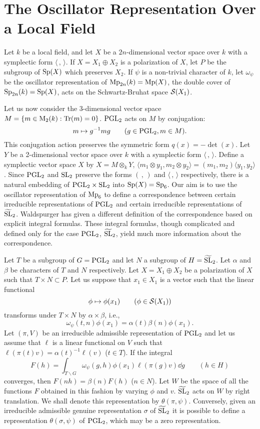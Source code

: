 \section{The Oscillator Representation Over a Local Field}
\label{sec:2}

Let $k$ be a local field, and let $X$ be a $2n$-dimensional vector space over $k$ with a symplectic form $\langle\,,\,\rangle$.
If $X = X_1 \oplus X_2$ is a polarization of $X$, let $P$ be the subgroup of $\mathrm{Sp}(X)$ which preserves $X_2$.
If $\psi$ is a non-trivial character of $k$, let $\omega_\psi$ be the oscillator representation of $\mathrm{Mp}_{2n}(k) = \mathrm{Mp}(X)$, the double cover of $\mathrm{Sp}_{2n}(k) = \mathrm{Sp}(X)$, acts on the Schwartz-Bruhat space $\mathcal{S}(X_1)$.

Let us now consider the 3-dimensional vector space $M = \{m \in \mathrm{M}_2(k): \operatorname*{Tr}(m) = 0\}$.
$\mathrm{PGL}_2$ acts on $M$ by conjugation:
\[
m \mapsto g^{-1} m g \qquad(g \in \mathrm{PGL}_2, m \in M).
\]
This conjugation action preserves the symmetric form $q(x) = -\det(x)$.
Let $Y$ be a 2-dimensional vector space over $k$ with a symplectic form $\langle\,,\,\rangle$.
Define a symplectic vector space $X$ by $X = M \otimes_k Y$,
$\langle m_1 \otimes y_1, m_2 \otimes y_2\rangle = (m_1, m_2) \langle y_1, y_2 \rangle$.
Since $\mathrm{PGL}_2$ and $\mathrm{SL}_2$ preserve
the forms $(\,,\,)$ and $\langle\,,\,\rangle$ respectively, there is a natural embedding of $\mathrm{PGL}_2 \times \mathrm{SL}_2$ into $\mathrm{Sp}(X) = \mathrm{Sp}_6$.
Our aim is to use the oscillator representation of $\mathrm{Mp}_6$ to define a correspondence between certain irreducible representations of $\mathrm{PGL}_2$ and certain irreducible representations of $\widetilde{\mathrm{SL}}_2$.
Waldspurger has given a different definition of the correspondence based on explicit integral formulas.
These integral formulas, though complicated and defined only for the case $\mathrm{PGL}_2$, $\widetilde{\mathrm{SL}}_2$, yield much more information about the correspondence.

Let $T$ be a subgroup of $G = \mathrm{PGL}_2$ and let $N$ a subgroup of $H = \widetilde{\mathrm{SL}}_2$.
Let $\alpha$ and $\beta$ be characters of $T$ and $N$ respectively.
Let $X = X_1 \oplus X_2$ be a polarization of $X$ such that $T \times N \subset P$.
Let us suppose that $x_1 \in X_1$ is a vector such that the linear functional
\[
\phi \mapsto \phi(x_1) \qquad (\phi \in \mathcal{S}(X_1))
\]
transforms under $T\times N$ by $\alpha \times \beta$, i.e.,
\[
\omega_\psi(t, n)\phi(x_1) = \alpha(t) \beta(n) \phi(x_1).
\]
Let $(\pi, V)$ be an irreducible admissible representation of $\mathrm{PGL}_2$ and let us assume that $\ell$ is a linear functional on $V$ such that $\ell(\pi(t)v) = \alpha(t)^{-1}\ell(v)$ ($t \in T$).
If the integral
\[
F(h) = \int_{T\backslash G} \omega_\psi(g, h) \phi(x_1) \ell(\pi(g)v)  \dd g \qquad (h \in H)
\]
converges, then $F(nh) = \beta(n)F(h)$ ($n \in N$).
Let $W$ be the space of all the functions $F$ obtained in this fashion by varying $\phi$ and $v$.
$\widetilde{\mathrm{SL}}_2$ acts on $W$ by right translation. We shall denote this representation by $\theta(\pi, \psi)$.
Conversely, given an irreducible admissible genuine representation $\sigma$ of $\widetilde{\mathrm{SL}}_2$ it is possible to define a representation
$\theta(\sigma, \psi)$ of $\mathrm{PGL}_2$, which may be a zero representation.

